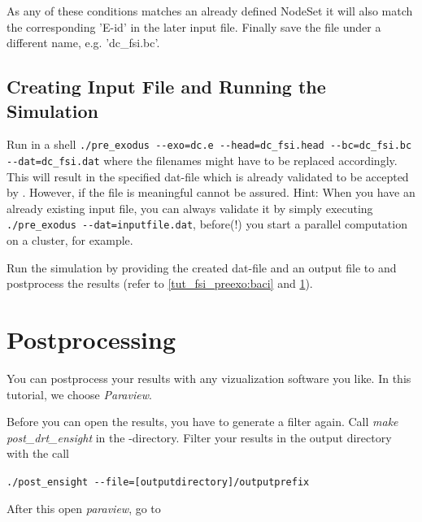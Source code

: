 As any of these conditions matches an already defined NodeSet it will also match the corresponding 'E-id' in the later \baci{} input file.
Finally save the file under a different name, e.g. 'dc\_fsi.bc'.

\subsection{Creating \baci{} Input File and Running the Simulation}
Run in a shell \verb|./pre_exodus --exo=dc.e --head=dc_fsi.head --bc=dc_fsi.bc --dat=dc_fsi.dat| where the filenames might have to be replaced accordingly. This will result in the specified dat-file which is already validated to be accepted by \baci{}. However, if the file is meaningful cannot be assured. Hint: When you have an already existing input file, you can always validate it by simply executing
\verb|./pre_exodus --dat=inputfile.dat|, before(!) you start a parallel \baci{} computation on a cluster, for example. \newline

Run the simulation by providing the created dat-file and an output file to \baci{} and postprocess the results (refer to \ref{tut_fsi_preexo:baci} and \ref{tut_fsi_preexo:postprocess}).

\section{Postprocessing}
\label{tut_fsi_preexo:postprocess}
You can postprocess your results with any vizualization software you like. In this tutorial, we choose \emph{Paraview}. \newline

Before you can open the results, you have to generate a filter again. Call \emph{make post\_drt\_ensight} in the \baci{}-directory.
Filter your results in the output directory with the call
\begin{center}
	\verb|./post_ensight --file=[outputdirectory]/outputprefix|
\end{center}
After this open \emph{paraview}, go to

